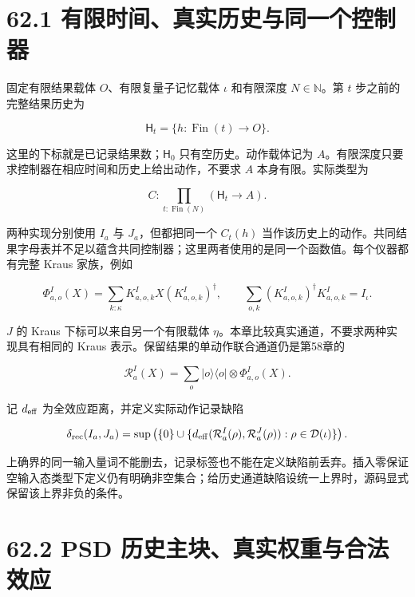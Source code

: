 \documentclass[
  11pt,
  oneside]{book}
\begin{document}
\hypertarget{ux6709ux9650ux65f6ux95f4ux771fux5b9eux5386ux53f2ux4e0eux540cux4e00ux4e2aux63a7ux5236ux5668}{%
\section{62.1
有限时间、真实历史与同一个控制器}\label{ux6709ux9650ux65f6ux95f4ux771fux5b9eux5386ux53f2ux4e0eux540cux4e00ux4e2aux63a7ux5236ux5668}}

固定有限结果载体 \(O\)、有限复量子记忆载体 \(\iota\) 和有限深度
\(N\in\mathbb N\)。第 \(t\) 步之前的完整结果历史为

\[
\mathsf H_t=\{h:\operatorname{Fin}(t)\to O\}.
\]

这里的下标就是已记录结果数；\(\mathsf H_0\) 只有空历史。动作载体记为
\(A\)。有限深度只要求控制器在相应时间和历史上给出动作，不要求 \(A\)
本身有限。实际类型为

\[
C:\prod_{t:\operatorname{Fin}(N)}(\mathsf H_t\to A).
\]

两种实现分别使用 \(I_a\) 与 \(J_a\)，但都把同一个 \(C_t(h)\)
当作该历史上的动作。共同结果字母表并不足以蕴含共同控制器；这里两者使用的是同一个函数值。每个仪器都有完整
Kraus 家族，例如

\[
\Phi^I_{a,o}(X)=\sum_{k:\kappa}K^I_{a,o,k}X(K^I_{a,o,k})^\dagger,
\qquad
\sum_{o,k}(K^I_{a,o,k})^\dagger K^I_{a,o,k}=I_\iota.
\]

\(J\) 的 Kraus 下标可以来自另一个有限载体
\(\eta\)。本章比较真实通道，不要求两种实现具有相同的 Kraus
表示。保留结果的单动作联合通道仍是第58章的

\[
\mathcal R^I_a(X)=\sum_o|o\rangle\langle o|\otimes\Phi^I_{a,o}(X).
\]

记 \(d_{\rm eff}\) 为全效应距离，并定义实际动作记录缺陷

\[
\delta_{\rm rec}(I_a,J_a)
=\sup\left(\{0\}\cup
 \{d_{\rm eff}(\mathcal R^I_a(\rho),\mathcal R^J_a(\rho)):
   \rho\in\mathcal D(\iota)\}\right).
\]

上确界的同一输入量词不能删去，记录标签也不能在定义缺陷前丢弃。插入零保证空输入态类型下定义仍有明确非空集合；给历史通道缺陷设统一上界时，源码显式保留该上界非负的条件。

\hypertarget{psd-ux5386ux53f2ux4e3bux5757ux771fux5b9eux6743ux91cdux4e0eux5408ux6cd5ux6548ux5e94}{%
\section{62.2 PSD
历史主块、真实权重与合法效应}\label{psd-ux5386ux53f2ux4e3bux5757ux771fux5b9eux6743ux91cdux4e0eux5408ux6cd5ux6548ux5e94}}
\end{document}
